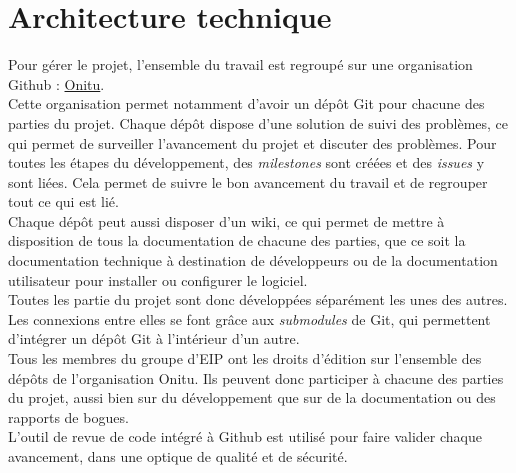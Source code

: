 \section{Architecture technique}
Pour gérer le projet, l'ensemble du travail est regroupé sur une organisation Github : \href{https://github.com/onitu/}{Onitu}.\\

Cette organisation permet notamment d'avoir un dépôt Git pour chacune des parties du projet. Chaque dépôt dispose d'une solution de suivi des problèmes, ce qui permet de surveiller l'avancement du projet et discuter des problèmes.
Pour toutes les étapes du développement, des \textit{milestones} sont créées et des \textit{issues} y sont liées. Cela permet de suivre le bon avancement du travail et de regrouper tout ce qui est lié.\\

Chaque dépôt peut aussi disposer d'un wiki, ce qui permet de mettre à disposition de tous la documentation de chacune des parties, que ce soit la documentation technique à destination de développeurs ou de la documentation utilisateur pour installer ou configurer le logiciel.\\

Toutes les partie du projet sont donc développées séparément les unes des autres. Les connexions entre elles se font grâce aux \textit{submodules} de Git, qui permettent
 d'intégrer un dépôt Git à l'intérieur d'un autre.\\

Tous les membres du groupe d'EIP ont les droits d'édition sur l'ensemble des dépôts de l'organisation Onitu. Ils peuvent donc participer à chacune des parties du projet, aussi bien sur du développement que sur de la documentation ou des rapports de bogues.\\

L'outil de revue de code intégré à Github est utilisé pour faire valider chaque avancement, dans une optique de qualité et de sécurité.
